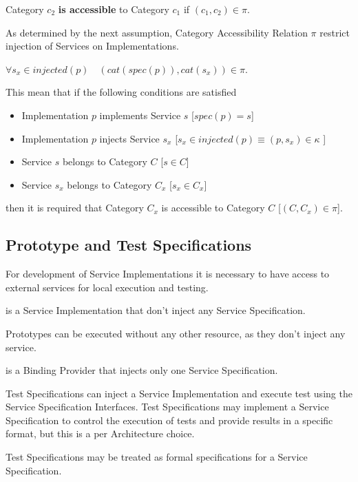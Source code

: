 Category $c_2$ \textbf{is accessible} to Category $c_1$ if $(c_1,c_2) \in \pi$.

As determined by the next assumption, Category Accessibility Relation $\pi$ restrict injection of Services on Implementations. 

\begin{zalozenie}
 \item $ \forall s_x \in injected(p) \quad  (cat(spec(p)),cat(s_x)) \in \pi$.
\end{zalozenie}

This mean that if the following conditions are satisfied
\begin{itemize}
\item Implementation $p$ implements Service $s$ [$spec(p) = s $]
\item Implementation $p$ injects Service $s_x$ [$ s_x \in injected(p) \equiv (p,s_x)\in\kappa$ ]
\item Service $s$ belongs to Category $C$ [$s\in C$]
\item Service $s_x$ belongs to Category  $C_x$ [$s_x\in C_x$]
\end{itemize}
 then it is required that Category $C_x$ is accessible to Category $C$ [$(C,C_x)\in \pi $].

\subsection{Prototype and Test Specifications}

For development of Service Implementations it is necessary to have access to external services for local execution and testing.

\begin{defi}
  is a Service Implementation that don't inject any Service Specification.
\end{defi}

Prototypes can be executed without any other resource, as they don't inject any service.

\begin{defi}
  is a Binding Provider that injects only one Service Specification.
\end{defi}

Test Specifications can inject a Service Implementation and execute test using the Service Specification Interfaces. Test Specifications may implement a Service Specification to control the execution of tests and provide results in a specific format, but this is a per Architecture choice.

Test Specifications may be treated as formal specifications for a Service Specification.

